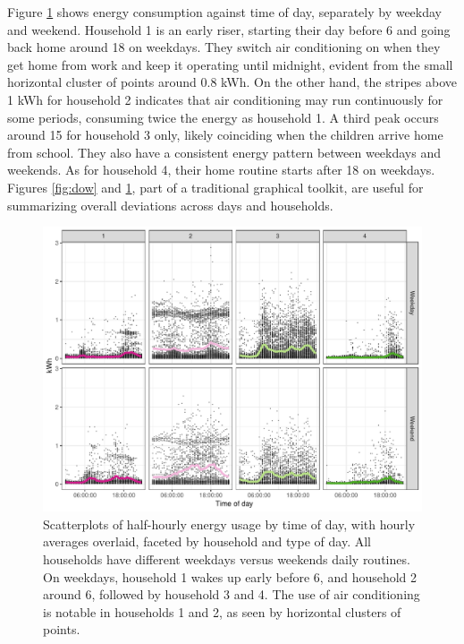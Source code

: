 \documentclass[12pt]{article}
\begin{document}
Figure \ref{fig:hod} shows energy consumption against time of day, separately by weekday and weekend. Household 1 is an early riser, starting their day before 6 and going back home around 18 on weekdays. They switch air conditioning on when they get home from work and keep it operating until midnight, evident from the small horizontal cluster of points around 0.8 kWh. On the other hand, the stripes above 1 kWh for household 2 indicates that air conditioning may run continuously for some periods, consuming twice the energy as household 1. A third peak occurs around 15 for household 3 only, likely coinciding when the children arrive home from school. They also have a consistent energy pattern between weekdays and weekends. As for household 4, their home routine starts after 18 on weekdays. Figures \ref{fig:dow} and \ref{fig:hod}, part of a traditional graphical toolkit, are useful for summarizing overall deviations across days and households.

\begin{figure}

{\centering \includegraphics[width=\textwidth]{figure/hod-1} 

}

\caption{Scatterplots of half-hourly energy usage by time of day, with hourly averages overlaid, faceted by household and type of day. All households have different weekdays versus weekends daily routines. On weekdays, household 1 wakes up early before 6, and household 2 around 6, followed by household 3 and 4. The use of air conditioning is notable in households 1 and 2, as seen by horizontal clusters of points.}\label{fig:hod}
\end{figure}
\end{document}

